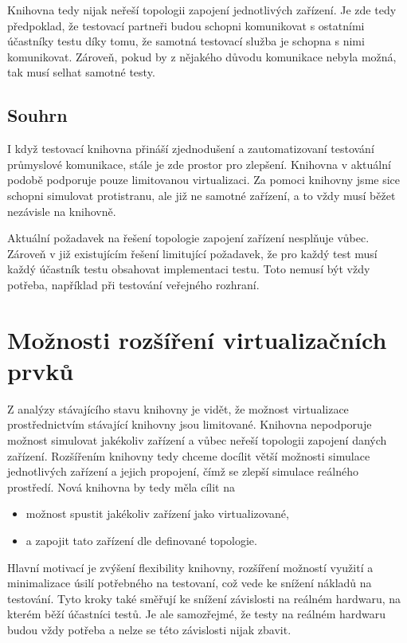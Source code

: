 Knihovna tedy nijak neřeší topologii zapojení jednotlivých zařízení. Je zde tedy předpoklad, že testovací partneři budou schopni komunikovat s ostatními účastníky testu díky tomu, že samotná testovací služba je schopna s nimi komunikovat. Zároveň, pokud by z nějakého důvodu komunikace nebyla možná, tak musí selhat samotné testy.

\subsection{Souhrn}

I když testovací knihovna přináší zjednodušení a zautomatizovaní testování průmyslové komunikace, stále je zde prostor pro zlepšení. Knihovna v aktuální podobě podporuje pouze limitovanou virtualizaci. Za pomoci knihovny jsme sice schopni simulovat protistranu, ale již ne samotné zařízení, a to vždy musí běžet nezávisle na knihovně. 

Aktuální požadavek na řešení topologie zapojení zařízení nesplňuje vůbec. Zároveň v již existujícím řešení limitující požadavek, že pro každý test musí každý účastník testu obsahovat implementaci testu. Toto nemusí být vždy potřeba, například při testování veřejného rozhraní. 

\section{Možnosti rozšíření virtualizačních prvků}

Z analýzy stávajícího stavu knihovny je vidět, že možnost virtualizace prostřednictvím stávající knihovny jsou limitované. Knihovna nepodporuje možnost simulovat jakékoliv zařízení a vůbec neřeší topologii zapojení daných zařízení. Rozšířením knihovny tedy chceme docílit větší možnosti simulace jednotlivých zařízení a jejich propojení, čímž se zlepší simulace reálného prostředí. Nová knihovna by tedy měla cílit na

\begin{itemize}
    \item možnost spustit jakékoliv zařízení jako virtualizované,
    \item a zapojit tato zařízení dle definované topologie. 
\end{itemize}

Hlavní motivací je zvýšení flexibility knihovny, rozšíření možností využití a minimalizace úsilí potřebného na testovaní, což vede ke snížení nákladů na testování. Tyto kroky také směřují ke snížení závislosti na reálném hardwaru, na kterém běží účastníci testů. Je ale samozřejmé, že testy na reálném hardwaru budou vždy potřeba a nelze se této závislosti nijak zbavit.

